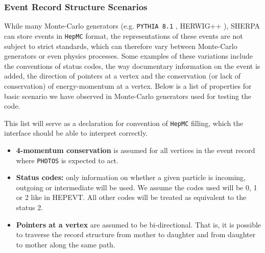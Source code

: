 \documentclass[]{Photos_interface_design}
\begin{document}
\subsubsection{Event Record Structure Scenarios}



While many Monte-Carlo generators (e.g. {\tt PYTHIA 8.1} \cite{Sjostrand:2007gs}, 
HERWIG++ \cite{Bahr:2008pv}), SHERPA \cite{Gleisberg:2008ta} can 
store events in {\tt HepMC} format, the  representations of
these events are not subject to strict standards,  which can therefore
vary between Monte-Carlo generators or even physics processes. Some examples
of these variations include the conventions of status codes, the  way
documentary information on the event is added, the direction of pointers at a vertex
and the conservation (or lack of conservation) of energy-momentum at a vertex.
Below is a list of properties for basic scenario we have observed in Monte-Carlo
generators used for testing the code.

This list will serve as a declaration for convention of  {\tt HepMC} filling, which  the 
interface should  be able to interpret correctly.

\begin{itemize}
  \item \textbf{4-momentum conservation} is assumed for all vertices in the event record where {\tt PHOTOS} is expected to act.
  \item \textbf{Status codes:} only information on whether a given particle is incoming, outgoing or intermediate will be used. We assume the codes used will be 0, 1 or 2 like in HEPEVT. All other codes will be treated as
equivalent to  the status 2.
  \item \textbf{Pointers at a vertex} are assumed to be bi-directional. That is, it is possible to traverse the record structure from mother to daughter and from daughter to mother along the same path.
\end{itemize}
\end{document}
